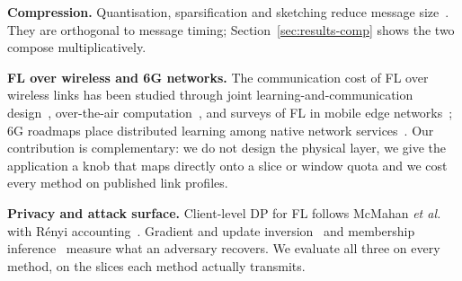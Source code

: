 \textbf{Compression.} Quantisation, sparsification and sketching reduce message size~\cite{sattler2020,rothchild2020}. They are orthogonal to message timing; Section~\ref{sec:results-comp} shows the two compose multiplicatively.

\textbf{FL over wireless and 6G networks.} The communication cost of FL over wireless links has been studied through joint learning-and-communication design~\cite{chen2021joint}, over-the-air computation~\cite{yang2020ota}, and surveys of FL in mobile edge networks~\cite{lim2020,niknam2020}; 6G roadmaps place distributed learning among native network services~\cite{letaief2019,saad2020}. Our contribution is complementary: we do not design the physical layer, we give the application a knob that maps directly onto a slice or window quota and we cost every method on published link profiles.

\textbf{Privacy and attack surface.} Client-level DP for FL follows McMahan \emph{et al.}~\cite{mcmahan2018dp} with R\'enyi accounting~\cite{mironov2017}. Gradient and update inversion~\cite{zhu2019dlg,geiping2020} and membership inference~\cite{yeom2018} measure what an adversary recovers. We evaluate all three on every method, on the slices each method actually transmits.
